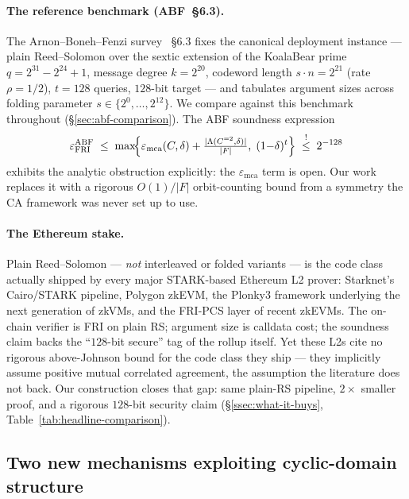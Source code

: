 \documentclass[11pt]{article}
\theoremstyle{definition}
\theoremstyle{remark}
\begin{document}
\paragraph{The reference benchmark (ABF~\S 6.3).}
The Arnon--Boneh--Fenzi survey~\cite{ABF} \S 6.3 fixes the canonical
deployment instance --- plain Reed--Solomon over the sextic extension
of the KoalaBear prime $q = 2^{31} - 2^{24} + 1$, message degree
$k = 2^{20}$, codeword length $s \cdot n = 2^{21}$ (rate $\rho = 1/2$),
$t = 128$ queries, $128$-bit target --- and tabulates argument sizes
across folding parameter $s \in \{2^0, \ldots, 2^{12}\}$. We compare
against this benchmark throughout (\S\ref{sec:abf-comparison}). The
ABF soundness expression
\[
 \varepsilon^{\mathrm{ABF}}_{\mathrm{FRI}}
 \;\leq\; \max\!\Bigl\{
 \varepsilon_{\mathrm{mca}}(C, \delta)
 + \tfrac{|\Lambda(C^{=2}, \delta)|}{|F|},\;
 (1{-}\delta)^{t}
 \Bigr\}
 \;\stackrel{!}{\leq}\; 2^{-128}
\]
exhibits the analytic obstruction explicitly: the $\varepsilon_{\mathrm{mca}}$
term is open. Our work replaces it with a rigorous $O(1)/|F|$
orbit-counting bound from a symmetry the CA framework was never set
up to use.

\paragraph{The Ethereum stake.}
Plain Reed--Solomon --- \emph{not} interleaved or folded variants ---
is the code class actually shipped by every major STARK-based
Ethereum L2 prover: Starknet's Cairo/STARK pipeline, Polygon zkEVM,
the Plonky3 framework underlying the next generation of zkVMs, and
the FRI-PCS layer of recent zkEVMs. The on-chain verifier is FRI on
plain RS; argument size is calldata cost; the soundness claim backs
the ``$128$-bit secure'' tag of the rollup itself. Yet these L2s cite
no rigorous above-Johnson bound for the code class they ship --- they
implicitly assume positive mutual correlated agreement, the assumption
the literature does not back. Our construction closes that gap: same
plain-RS pipeline, $2{\times}$ smaller proof, and a rigorous $128$-bit
security claim (\S\ref{ssec:what-it-buys},
Table~\ref{tab:headline-comparison}).

\subsection{Two new mechanisms exploiting cyclic-domain structure}
\end{document}
